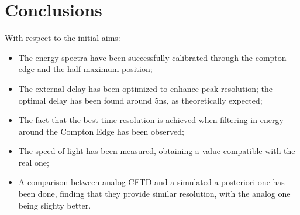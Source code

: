 \documentclass[11pt,a4 paper]{article}
\begin{document}
\section{Conclusions}
With respect to the initial aims:
\begin{itemize}[noitemsep]
    \item The energy spectra have been successfully calibrated through the compton edge and the half maximum position;
    \item The external delay has been optimized to enhance peak resolution; the optimal delay has been found around 5ns, as theoretically expected;
    \item The fact that the best time resolution is achieved when filtering in energy around the Compton Edge has been observed;
    \item The speed of light has been measured, obtaining a value compatible with the real one;
    \item A comparison between analog CFTD and a simulated a-posteriori one has been done, finding that they provide similar resolution, with the analog one being slighty better.
\end{itemize}
\end{document}
